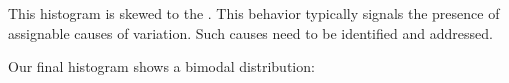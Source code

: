 \documentclass{ximera}
\begin{document}
\begin{example}
\begin{center}
      \end{center}

This histogram is skewed to the .  This behavior typically signals the presence of assignable causes of variation.  Such causes need to be identified and addressed.

Our final histogram shows a bimodal distribution:  

\begin{center}
      \end{center}


\end{example}
\end{document}
